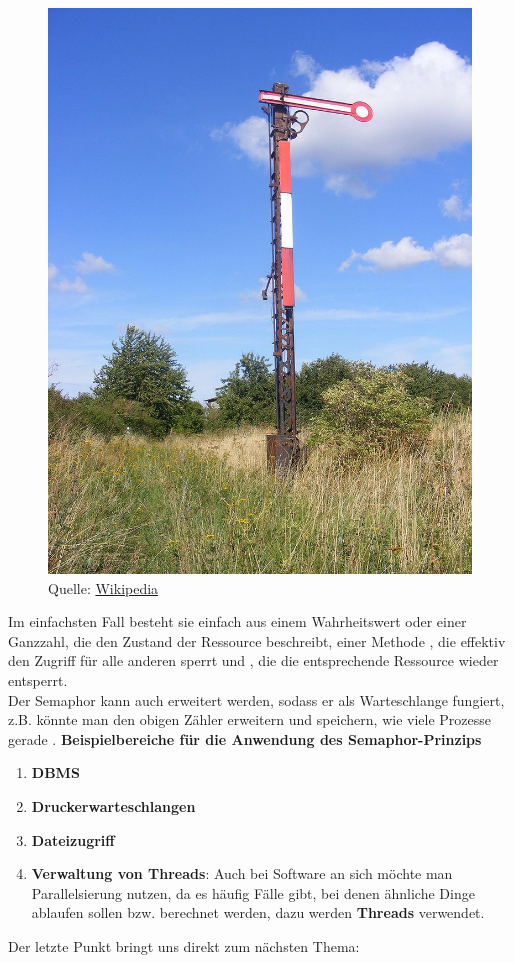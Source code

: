 \documentclass{article}
\begin{document}
\begin{figure}[H]
\begin{minipage}{0.6\textwidth}
    \end{minipage}
    \begin{minipage}{0.4\textwidth}
        \centering
        \includegraphics[scale=0.2]{../../media/semaphor.jpg}
        \caption{Quelle: \href{https://de.wikipedia.org/wiki/Semaphor_(Informatik)}{Wikipedia}}
    \end{minipage}
\end{figure}

Im einfachsten Fall besteht sie einfach aus einem Wahrheitswert oder einer Ganzzahl, die den Zustand der Ressource beschreibt, einer Methode , die effektiv den Zugriff für alle anderen sperrt und , die die entsprechende Ressource wieder entsperrt. \\
Der Semaphor kann auch erweitert werden, sodass er als Warteschlange fungiert, z.B. könnte man den obigen Zähler erweitern und speichern, wie viele Prozesse gerade .
\textbf{Beispielbereiche für die Anwendung des Semaphor-Prinzips}
\begin{enumerate}
    \item \textbf{DBMS}
    \item \textbf{Druckerwarteschlangen}
    \item \textbf{Dateizugriff}
    \item \textbf{Verwaltung von Threads}: Auch bei Software an sich möchte man Parallelsierung nutzen, da es häufig Fälle gibt, bei denen ähnliche Dinge  ablaufen sollen bzw. berechnet werden, dazu werden \textbf{Threads} verwendet. 
\end{enumerate}
Der letzte Punkt bringt uns direkt zum nächsten Thema: 
\end{document}
